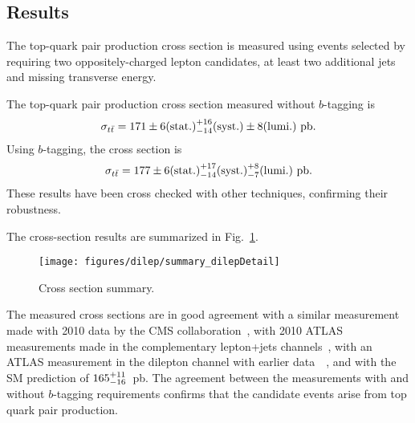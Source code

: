 \subsection{Results}
\label{s:summary}


The top-quark pair production cross section is measured using  events
selected by requiring two oppositely-charged lepton candidates, at least two
additional jets and missing transverse energy.

The top-quark pair production cross section measured without
$b$-tagging is
\[
\sigma_{t\bar{t}}=\mathrm{}171 \pm 6 \mathrm{(stat.)}^{+16}_{-14} \mathrm{(syst.)} \pm 8 \mathrm{(lumi.)}~\rm pb.
\]
Using $b$-tagging, the cross section is
\[
\sigma_{t\bar{t}}=\mathrm{}177 \pm 6  \mathrm{(stat.)}^{+17}_{-14} \mathrm{(syst.)} ^{+8}_{-7}  \mathrm{(lumi.)}~\rm pb.
\]
These results have been cross checked with other techniques,
confirming their robustness.



The cross-section results are summarized in Fig.~\ref{fig:XsecSummary}.

\begin{figure}[!h]
\centering
\texttt{[image: figures/dilep/summary\_dilepDetail]}
    \caption{ Cross section summary.}
    \label{fig:XsecSummary}
\end{figure}

The measured cross sections are in good agreement with a similar
measurement made with 2010 data by the CMS
collaboration~\cite{Chatrchyan:2011nb}, with 2010 ATLAS measurements
made in the complementary lepton+jets
channels~\cite{ATLAS-CONF-2011-023,ATLAS-CONF-2011-035}, with an
ATLAS measurement in the dilepton channel with earlier
data~~\cite{ATL-CONF-2011-034}, and with the SM prediction of
$165^{+11}_{-16}$~pb. The agreement between the measurements with
and without $b$-tagging requirements confirms that the candidate
events arise from top quark pair production.
